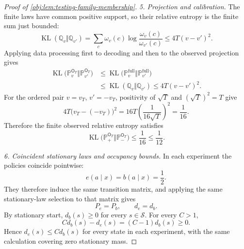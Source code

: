 \begin{proof}[Proof of \cref{obj:lem:testing-family-membership}]
\emph{5. Projection and calibration.}
The finite laws have common positive support, so their relative entropy is the finite sum just bounded:
\[
\operatorname{KL}(\mathbb Q_v\Vert\mathbb Q_{v'})
=\sum_c\omega_v(c)\log\frac{\omega_v(c)}{\omega_{v'}(c)}
\leq4T(v-v')^2.
\]
Applying data processing first to decoding and then to the observed projection gives
\[
\begin{aligned}
\operatorname{KL}
 \bigl(\mathbb P_v^{\mathsf O_T}\Vert
       \mathbb P_{v'}^{\mathsf O_T}\bigr)
&\leq
\operatorname{KL}
 \bigl(\mathbb P_v^{\mathrm{full}}\Vert
       \mathbb P_{v'}^{\mathrm{full}}\bigr)\\
&\leq\operatorname{KL}(\mathbb Q_v\Vert\mathbb Q_{v'})
\leq4T(v-v')^2.
\end{aligned}
\]
For the ordered pair \(v=v_T\), \(v'=-v_T\), positivity of \(\sqrt T\) and
\((\sqrt T)^2=T\) give
\[
4T\bigl(v_T-(-v_T)\bigr)^2
=16T\left(\frac1{16\sqrt T}\right)^2
=\frac1{16}.
\]
Therefore the finite observed relative entropy satisfies
\[
\operatorname{KL}
 \bigl(\mathbb P_+^{\mathsf O_T}\Vert
       \mathbb P_-^{\mathsf O_T}\bigr)
\leq\frac1{16}\leq\frac1{12}.
\]

\emph{6. Coincident stationary laws and occupancy bounds.}
In each experiment the policies coincide pointwise:
\[
e(a\mid x)=b(a\mid x)=\frac12.
\]
They therefore induce the same transition matrix, and applying the same stationary-law selection to that matrix gives
\[
P_e=P_b,\qquad d_e=d_b.
\]
By stationary start, \(d_b(s)\geq0\) for every \(s\in\mathcal S\). For every \(C>1\),
\[
Cd_b(s)-d_e(s)=(C-1)d_b(s)\geq0.
\]
Hence \(d_e(s)\leq Cd_b(s)\) for every state in each experiment, with the same calculation covering zero stationary mass.
\end{proof}
